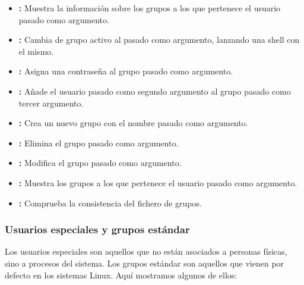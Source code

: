 \begin{itemize}
	\item{}\textbf{:} Muestra la información sobre los grupos a los que pertenece el usuario pasado como argumento.
	\item{}\textbf{:} Cambia de grupo activo al pasado como argumento, lanzando una shell con el mismo.
	\item{}\textbf{:} Asigna una contraseña al grupo pasado como argumento.
	\item{}\textbf{:} Añade el usuario pasado como segundo argumento al grupo pasado como tercer argumento.
	\item{}\textbf{:} Crea un nuevo grupo con el nombre pasado como argumento.
	\item{}\textbf{:} Elimina el grupo pasado como argumento.
	\item{}\textbf{:} Modifica el grupo pasado como argumento.
	\item{}\textbf{:} Muestra los grupos a los que pertenece el usuario pasado como argumento.
	\item{}\textbf{:} Comprueba la consistencia del fichero de grupos.
\end{itemize}

\subsubsection{Usuarios especiales y grupos estándar}

Los usuarios especiales son aquellos que no están asociados a personas físicas, sino a procesos del sistema.
Los grupos estándar son aquellos que vienen por defecto en los sistemas Linux.
Aquí mostramos algunos de ellos:

